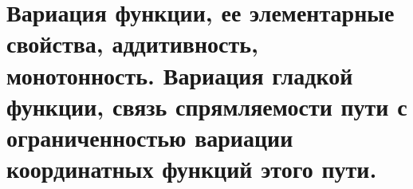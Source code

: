 \documentclass[../main.tex]{subfiles}
\begin{document}
\newpage
\section{Вариация функции, ее элементарные свойства, аддитивность, монотонность. Вариация гладкой функции, связь спрямляемости пути с ограниченностью вариации координатных функций этого пути.}
\end{document}
